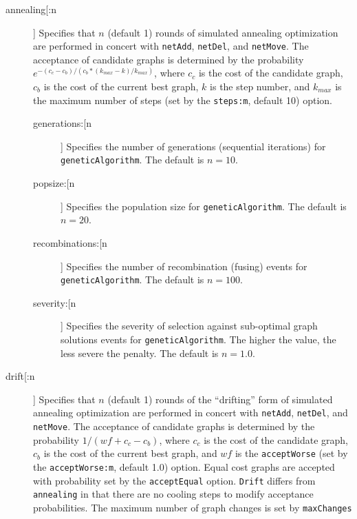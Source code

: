 		\begin{description}
		\item[annealing[:n]] Specifies that $n$ (default 1) rounds of simulated annealing optimization 
		\citep{Metropolisetal1953, Kirkpatricketal1983, Cerny1985} are performed in concert with 
		\texttt{netAdd}, \texttt{netDel}, and \texttt{netMove}. The acceptance of candidate graphs is 
		determined by the probability $e ^ {- (c_c - c_b)/ (c_b * (k_{max} -k)/ k_{max})}$, where $c_c$ 
		is the cost of the candidate graph, $c_b$ is the cost of the current best graph, $k$ is the step 
		number, and $k_{max}$ is the maximum number of steps (set by the \texttt{steps:m}, default 10) 
		option.
		
		\begin{description}
		
		\item[generations:[n]] Specifies the number of generations (sequential iterations) for 
		\texttt{geneticAlgorithm}. The default is $n=10$.

		\item[popsize:[n]] Specifies the population size for \texttt{geneticAlgorithm}. The default is 
		$n=20$.
			
		\item[recombinations:[n]] Specifies the number of recombination (fusing) events for 
		\texttt{geneticAlgorithm}. The default is $n=100$.
			
		\item[severity:[n]] Specifies the severity of selection against sub-optimal graph solutions 
		events for \texttt{geneticAlgorithm}. The higher the value, the less severe the penalty. The 
		default is $n=1.0$.

		\end{description}

			
		\item[drift[:n]] Specifies that $n$ (default 1) rounds of the ``drifting'' form of simulated annealing 
		\citep{goloboff1999} optimization are performed in concert with \texttt{netAdd}, 	\texttt{netDel}, 
		and \texttt{netMove}. The acceptance of candidate graphs is determined by the probability 
		$1/ (wf + c_c - c_b)$, where $c_c$ is the cost of the candidate graph, $c_b$ is the cost of the 
		current best graph, and $wf$ is the \texttt{acceptWorse} (set by the \texttt{acceptWorse:m}, 
		default 1.0) option. Equal cost graphs are accepted with probability set by the \texttt{acceptEqual} 
		option. \texttt{Drift} differs from \texttt{annealing} in that there are no cooling steps to modify 
		acceptance probabilities. The maximum number of graph changes is set by \texttt{maxChanges}
			

\end{description}
